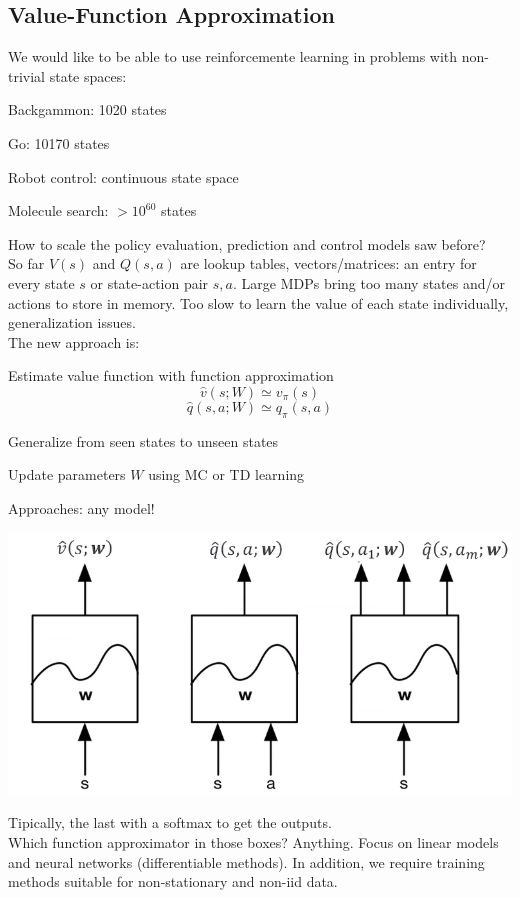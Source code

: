 \documentclass[10pt]{report}
\begin{document}
\subsection{Value-Function Approximation}
We would like to be able to use reinforcemente learning in problems with non-trivial state spaces:\begin{list}{}{}
	\item Backgammon: 1020 states
	\item Go: 10170 states
	\item Robot control: continuous state space
	\item Molecule search: $>10^{60}$ states
\end{list}
How to scale the policy evaluation, prediction and control models saw before?\\
So far $V(s)$ and $Q(s,a)$ are lookup tables, vectors/matrices: an entry for every state $s$ or state-action pair $s,a$. Large MDPs bring too many states and/or actions to store in memory. Too slow to learn the value of each state individually, generalization issues.\\
The new approach is:
\begin{list}{}{}
	\item Estimate value function with function approximation 
	$$\hat{v}(s;W)\simeq v_\pi(s)$$
	$$\hat{q}(s,a;W)\simeq q_\pi(s,a)$$
	\item Generalize from seen states to unseen states
	\item Update parameters $W$ using MC or TD learning
\end{list}
Approaches: any model!
\begin{center}
	\includegraphics[scale=0.5]{176.png}
\end{center}
Tipically, the last with a softmax to get the outputs.\\
Which function approximator in those boxes? Anything. Focus on linear models and neural networks (differentiable methods). In addition, we require training methods suitable for non-stationary and non-iid data.
\end{document}
